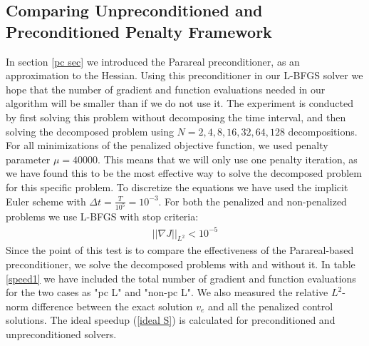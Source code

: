\subsection{Comparing Unpreconditioned and Preconditioned Penalty Framework}
In section \ref{pc sec} we introduced the Parareal preconditioner, as an approximation to the Hessian. Using this preconditioner in our L-BFGS solver we hope that the number of gradient and function evaluations needed in our algorithm will be smaller than if we do not use it. The experiment is conducted by first solving this problem without decomposing the time interval, and then solving the decomposed problem using $N=2,4,8,16,32,64,128$ decompositions. For all minimizations of the penalized objective function, we used penalty parameter $\mu=40000$. This means that we will only use one penalty iteration, as we have found this to be the most effective way to solve the decomposed problem for this specific problem. To discretize the equations we have used the implicit Euler scheme with $\Delta t= \frac{T}{10^5}=10^{-3}$. For both the penalized and non-penalized problems we use L-BFGS with stop criteria:
\begin{align*}
||\nabla J||_{L^2} <10^{-5}
\end{align*}  
Since the point of this test is to compare the effectiveness of the Parareal-based preconditioner, we solve the decomposed problems with and without it. In table \ref{speed1} we have included the total number of gradient and function evaluations for the two cases as "pc L" and "non-pc L". We also measured the relative $L^2$-norm difference between the exact solution $v_e$ and all the penalized control solutions. The ideal speedup (\ref{ideal S}) is calculated for preconditioned and unpreconditioned solvers.
\\
\\
